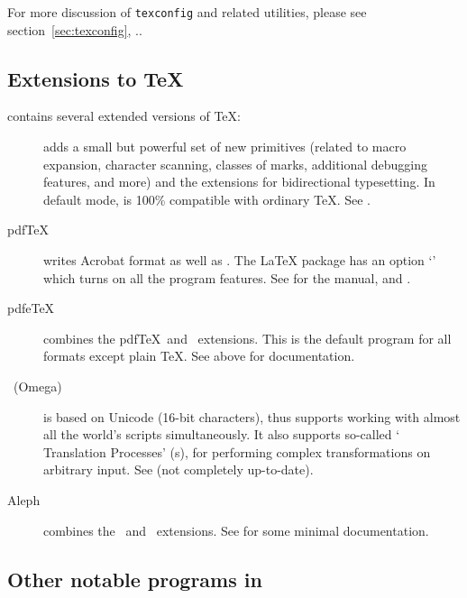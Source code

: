 \documentclass{article}
\begin{document}
For more discussion of \texttt{texconfig} and related utilities, please
see section~\ref{sec:texconfig}, \p.\pageref{sec:texconfig}.


\subsection{Extensions to \protect\TeX}
\label{sec:tex-extensions}

\TL{} contains several extended versions of \TeX:

\begin{description}

\item [\eTeX] adds a small but powerful set of new primitives
\label{text:etex} (related to macro expansion, character scanning,
classes of marks, additional debugging features, and more) and the
\TeXXeT{} extensions for bidirectional typesetting.  In default mode,
\eTeX{} is 100\% compatible with ordinary \TeX. See
.

\item [pdf\TeX] writes Acrobat  format as well as \dvi{}. The
\LaTeX{}  package has an option `'
which turns on all the program features.  See
 for the manual, and
.

\item [pdfe\TeX] combines the pdf\TeX\ and \eTeX\ extensions.  This is
the default program for all formats except plain \TeX.
See above for documentation.

\item [\OMEGA\ (Omega)] is based on Unicode (16-bit characters), thus
supports working with almost all the world's scripts simultaneously. It
also supports so-called `\OMEGA{} Translation Processes' (s),
for performing complex transformations on arbitrary input. See
 (not completely up-to-date).

\item [Aleph] combines the \OMEGA\ and \eTeX\ extensions.  
See  for some minimal documentation.

\end{description} 


\subsection{Other notable programs in \protect\TL}
\end{document}
